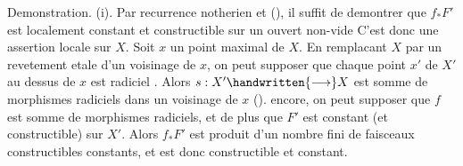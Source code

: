D\handwritten{\'}emonstration. (i). Par r\handwritten{\'}ecurrence noth\handwritten{\'}erien et (), il suffit de d\handwritten{\'}emontrer que $f_{*}F'$ est localement constant et constructible sur un ouvert non-vide  C'est donc une assertion locale sur $X$. Soit  $x$ un point maximal de $X$. En rempla\handwritten{\c}cant $X$ par un rev\handwritten{\^}etement \handwritten{\'}etale d'un voisinage de $x$, on peut supposer que chaque point $x'$ de $X'$ au dessus de $x$ est radiciel .  Alors $s:X'\handwritten{\longrightarrow}X$ est somme de morphismes radiciels dans un voisinage de $x$ ().    encore, on peut supposer que $f$ est somme de morphismes radiciels, et de plus que $F'$ est constant (et constructible) sur $X'$. Alors $f_{*}F'$ est produit d'un nombre fini de faisceaux constructibles constants, et est donc constructible et constant.

